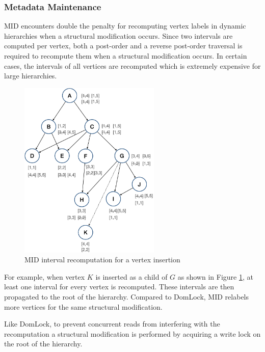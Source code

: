 \subsubsection{Metadata Maintenance}

MID encounters double the penalty for recomputing vertex labels in dynamic hierarchies when a structural modification occurs. Since two intervals are computed per vertex, both a post-order and a reverse post-order traversal is required to recompute them when a structural modification occurs. In certain cases, the intervals of all vertices are recomputed which is extremely expensive for large hierarchies.

\begin{figure}[H]
    \centering
    \captionsetup{justification=centering}
    \includegraphics[width=0.6\textwidth]{figures/MID_example_with_SM.png}
    \caption{MID interval recomputation for a vertex insertion}
    \label{fig:MID_example_SM}
    
\end{figure}

For example, when vertex $K$ is inserted as a child of $G$ as shown in Figure \ref{fig:MID_example_SM}, at least one interval for every vertex is recomputed. These intervals are then propagated to the root of the hierarchy. Compared to DomLock, MID relabels more vertices for the same structural modification. 


Like DomLock, to prevent concurrent reads from interfering with the recomputation a structural modification is performed by acquiring a write lock on the root of the hierarchy.

